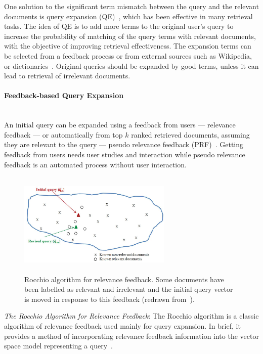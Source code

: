 One solution to the significant term mismatch between the query and the relevant documents is query expansion (QE)~\citep{Efthimiadis1996}, which has been effective in many retrieval tasks. The idea of QE is to add more terms to the original user's query to increase the probability of matching of the query terms with relevant documents, with the objective of improving retrieval effectiveness. The expansion terms can be selected from a feedback process or from external sources such as Wikipedia, or dictionaries~\citep{cao2008selecting}. Original queries should be expanded by good terms, unless it can lead to retrieval of irrelevant documents.
\paragraph{Feedback-based Query Expansion}
\ \\
An initial query can be expanded using a feedback from users --- relevance feedback --- or automatically from top $ k $ ranked retrieved documents, assuming they are relevant to the query --- pseudo relevance feedback (PRF)~\citep{manning2008introduction}. Getting feedback from  users needs user studies and interaction while pseudo relevance feedback is an automated process without user interaction.
\begin{figure}[t!]
   \centering
   \includegraphics[width=0.65\textwidth,height=50mm]{figs/rocchio.jpg}
   \caption{Rocchio algorithm for relevance feedback. Some documents have been labelled as relevant and irrelevant and the initial query vector is moved in response to this feedback (redrawn from~\citep[p.182]{manning2008introduction}).}  
   \label{fig:rocchio} 
\end{figure}
\FloatBarrier 
\textit{The Rocchio Algorithm for Relevance Feedback}: The Rocchio
algorithm \citep{Salton1971} is a classic algorithm of relevance feedback
used mainly for query expansion. In brief, it provides a method of
incorporating relevance feedback information into the vector space
model representing a query~\citep{manning2008introduction}. 
